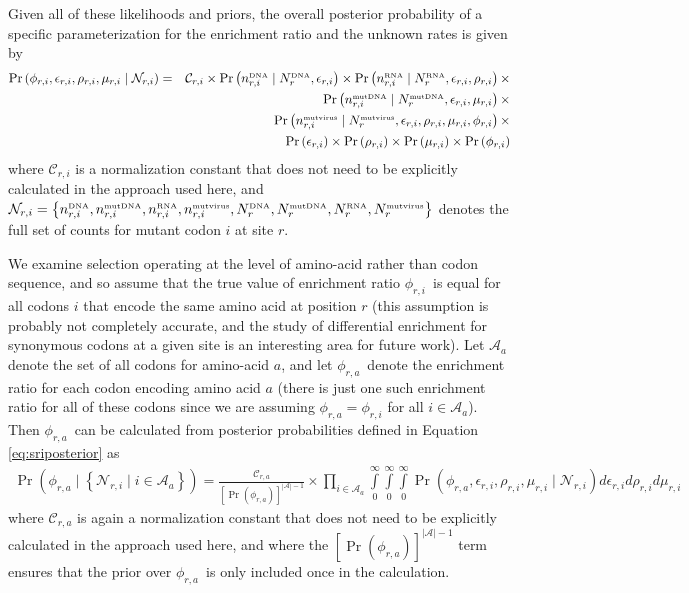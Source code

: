 \documentclass[10pt]{article}
\newcommand{\Nrdna}{\mbox{$N_r^{\rm \scriptscriptstyle DNA}$}}
\newcommand{\Nrmutdna}{\mbox{$N_r^{\rm \scriptscriptstyle mut DNA}$}}
\newcommand{\Nrrna}{\mbox{$N_r^{\rm \scriptscriptstyle RNA}$}}
\newcommand{\Nrmutvirus}{\mbox{$N_r^{\rm \scriptscriptstyle mut virus}$}}
\newcommand{\nrdnai}{\mbox{$n_{r, i}^{\rm \scriptscriptstyle DNA}$}}
\newcommand{\nrmutdnai}{\mbox{$n_{r, i}^{\rm \scriptscriptstyle mut DNA}$}}
\newcommand{\nrrnai}{\mbox{$n_{r, i}^{\rm \scriptscriptstyle  RNA}$}}
\newcommand{\nrmutvirusi}{\mbox{$n_{r, i}^{\rm \scriptscriptstyle mut virus}$}}
\newcommand{\eri}{\mbox{$\epsilon_{r,i}$}}
\newcommand{\sri}{\mbox{$\phi_{r,i}$}}
\newcommand{\rri}{\mbox{$\rho_{r,i}$}}
\newcommand{\mri}{\mbox{$\mu_{r,i}$}}
\newcommand{\sra}{\mbox{$\phi_{r,a}$}}
\begin{document}
Given all of these likelihoods and priors, the overall posterior probability of a specific parameterization for the enrichment ratio and the unknown rates is given by
\begin{eqnarray}
\label{eq:sriposterior}
 \Pr\left(\sri, \eri, \rri, \mri \mid \mathcal{N}_{r,i} \right) &=& 
\mathcal{C}_{r,i} \times 
\Pr\left(\nrdnai \mid \Nrdna, \eri\right) \times
\Pr\left(\nrrnai \mid \Nrrna, \eri, \rri\right)  \times \nonumber \\
&& \Pr\left(\nrmutdnai \mid \Nrmutdna, \eri, \mri\right) 
\times \nonumber \\
&& \Pr\left(\nrmutvirusi \mid \Nrmutvirus, \eri, \rri, \mri, \sri\right)  \times \nonumber \\
&& \Pr\left(\eri\right) \times \Pr\left(\rri\right) \times \Pr\left(\mri\right) \times \Pr\left(\sri\right)
\end{eqnarray}
where $\mathcal{C}_{r,i}$ is a normalization constant that does not need to be explicitly calculated in the approach used here, and $\mathcal{N}_{r,i} = \left\{\nrdnai, \nrmutdnai, \nrrnai, \nrmutvirusi, \Nrdna, \Nrmutdna, \Nrrna, \Nrmutvirus\right\}$ denotes the full set of counts for mutant codon $i$ at site $r$.

We examine selection operating at the level of amino-acid rather than codon sequence, and so assume that the true value of enrichment ratio \sri\ is equal for all codons $i$ that encode the same amino acid at position $r$ (this assumption is probably not completely accurate, and the study of differential enrichment for synonymous codons at a given site is an interesting area for future work). Let $\mathcal{A}_a$ denote the set of all codons for amino-acid $a$, and let \sra\ denote the enrichment ratio for each codon encoding amino acid $a$ (there is just one such enrichment ratio for all of these codons since we are assuming $\sra = \sri$ for all $i \in \mathcal{A}_a$). Then \sra\
can be calculated from posterior probabilities defined in Equation \ref{eq:sriposterior} as
\begin{eqnarray}
\label{eq:sraposterior}
\Pr\left(\sra \mid \left\{\mathcal{N}_{r,i} \mid i \in \mathcal{A}_a \right\}\right) = \frac{\mathcal{C}_{r,a}}{\left[\Pr\left(\sra\right)\right]^{|\mathcal{A}| - 1}} \times \prod\limits_{i \in \mathcal{A}_a} \int\limits_{0}^{\infty} \int\limits_{0}^{\infty} \int\limits_{0}^{\infty}\Pr\left(\sra, \eri, \rri, \mri \mid \mathcal{N}_{r,i}\right) d\eri d\rri d\mri
\end{eqnarray}
where $\mathcal{C}_{r,a}$ is again a normalization constant that does not need to be explicitly calculated in the approach used here, and where the $\left[\Pr\left(\sra\right)\right]^{|\mathcal{A}| - 1}$ term ensures that the prior over \sra\ is only included once in the calculation.
\end{document}
